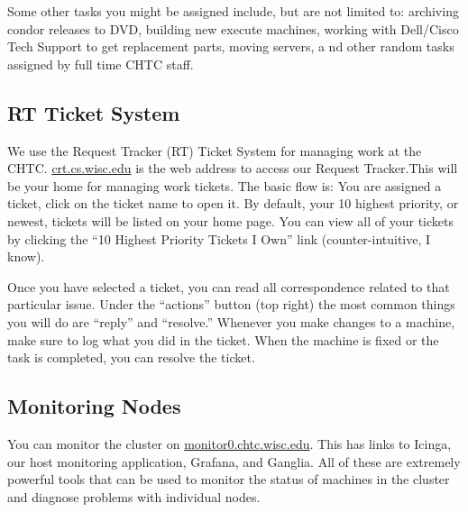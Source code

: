 \documentclass[10pt,letterpaper]{article}
\begin{document}
        Some other tasks you might be assigned include, but are not limited to:
        archiving condor releases to DVD, building new execute machines, working
        with Dell/Cisco Tech Support to get replacement parts, moving servers, a
        nd other random tasks assigned by full time CHTC staff.
    \subsection{RT Ticket System}
        We use the Request Tracker (RT) Ticket System for managing work at the CHTC.
        \href{https://crt.cs.wisc.edu/rt/}{crt.cs.wisc.edu} is the web address to
        access our Request Tracker.This will be your home for managing work tickets.
        The basic flow is: You are assigned a ticket, click on the ticket name to
        open it. By default, your 10 highest priority, or newest, tickets will be
        listed on your home page. You can view all of your tickets by clicking the
        “10 Highest Priority Tickets I Own” link (counter-intuitive, I know).

        Once you have selected a ticket, you can read all correspondence related
        to that particular issue. Under the “actions” button (top right) the most
        common things you will do are “reply” and “resolve.” Whenever you make
        changes to a machine, make sure to log what you did in the ticket. When
        the machine is fixed or the task is completed, you can resolve the ticket.

    \subsection{Monitoring Nodes}
        You can monitor the cluster on \href{monitor0.chtc.wisc.edu}{monitor0.chtc.wisc.edu}.
        This has links to Icinga, our host monitoring application, Grafana, and Ganglia.
        All of these are extremely powerful tools that can be used to monitor the
        status of machines in the cluster and diagnose problems with individual nodes.
\end{document}
